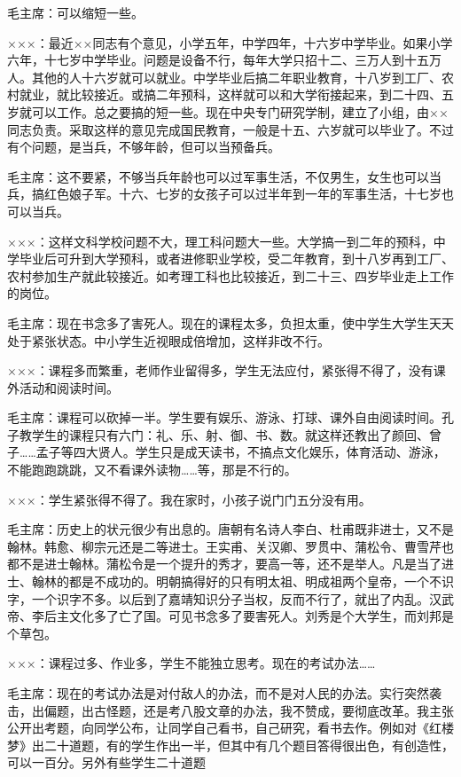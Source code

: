 毛主席：可以缩短一些。

×××：最近××同志有个意见，小学五年，中学四年，十六岁中学毕业。如果小学六年，十七岁中学毕业。问题是设备不行，每年大学只招十二、三万人到十五万人。其他的人十六岁就可以就业。中学毕业后搞二年职业教育，十八岁到工厂、农村就业，就比较接近。或搞二年预科，这样就可以和大学衔接起来，到二十四、五岁就可以工作。总之要搞的短一些。现在中央专门研究学制，建立了小组，由××同志负责。采取这样的意见完成国民教育，一般是十五、六岁就可以毕业了。不过有个问题，是当兵，不够年龄，但可以当预备兵。

毛主席：这不要紧，不够当兵年龄也可以过军事生活，不仅男生，女生也可以当兵，搞红色娘子军。十六、七岁的女孩子可以过半年到一年的军事生活，十七岁也可以当兵。

×××：这样文科学校问题不大，理工科问题大一些。大学搞一到二年的预科，中学毕业后可升到大学预科，或者进修职业学校，受二年教育，到十八岁再到工厂、农村参加生产就此较接近。如考理工科也比较接近，到二十三、四岁毕业走上工作的岗位。

毛主席：现在书念多了害死人。现在的课程太多，负担太重，使中学生大学生天天处于紧张状态。中小学生近视眼成倍增加，这样非改不行。

×××：课程多而繁重，老师作业留得多，学生无法应付，紧张得不得了，没有课外活动和阅读时间。

毛主席：课程可以砍掉一半。学生要有娱乐、游泳、打球、课外自由阅读时间。孔子教学生的课程只有六门：礼、乐、射、御、书、数。就这样还教出了颜回、曾子……孟子等四大贤人。学生只是成天读书，不搞点文化娱乐，体育活动、游泳，不能跑跑跳跳，又不看课外读物……等，那是不行的。

×××：学生紧张得不得了。我在家时，小孩子说门门五分没有用。


毛主席：历史上的状元很少有出息的。唐朝有名诗人李白、杜甫既非进士，又不是翰林。韩愈、柳宗元还是二等进士。王实甫、关汉卿、罗贯中、蒲松令、曹雪芹也都不是进士翰林。蒲松令是一个提升的秀才，要高一等，还不是举人。凡是当了进士、翰林的都是不成功的。明朝搞得好的只有明太祖、明成祖两个皇帝，一个不识字，一个识字不多。以后到了嘉靖知识分子当权，反而不行了，就出了内乱。汉武帝、李后主文化多了亡了国。可见书念多了要害死人。刘秀是个大学生，而刘邦是个草包。

×××：课程过多、作业多，学生不能独立思考。现在的考试办法……

毛主席：现在的考试办法是对付敌人的办法，而不是对人民的办法。实行突然袭击，出偏题，出古怪题，还是考八股文章的办法，我不赞成，要彻底改革。我主张公开出考题，向同学公布，让同学自己看书，自己研究，看书去作。例如对《红楼梦》出二十道题，有的学生作出一半，但其中有几个题目答得很出色，有创造性，可以一百分。另外有些学生二十道题

